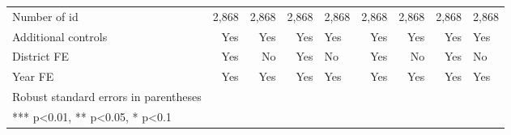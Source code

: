 \documentclass[
]{article}
\begin{document}
\begin{landscape}
\begin{longtable}[t]{lrrrlrrrl}
Number of id & 2,868 & 2,868 & 2,868 & 2,868 & 2,868 & 2,868 & 2,868 & 2,868\\
Additional controls & Yes & Yes & Yes & Yes & Yes & Yes & Yes & Yes\\
\addlinespace
District FE & Yes & No & Yes & No & Yes & No & Yes & No\\
Year FE & Yes & Yes & Yes & Yes & Yes & Yes & Yes & Yes\\
\midrule
Robust standard errors in parentheses &  &  &  &  &  &  &  & \\
*** p<0.01, ** p<0.05, * p<0.1 &  &  &  &  &  &  &  & \\*
\end{longtable}
\end{landscape}
\endgroup{}
\newpage

\begingroup\fontsize{7}{9}\selectfont
\end{document}
